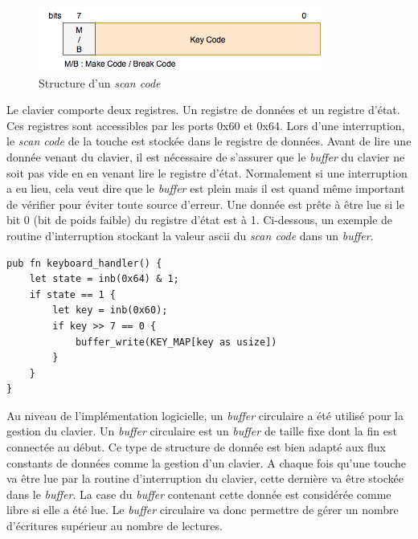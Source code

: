 \begin{figure}[!h]
  \centering
  \includegraphics[scale=0.8]{images/scancode.png}
  \caption{Structure d'un \textit{scan code}}
  \label{scancode}
\end{figure}

Le clavier comporte deux registres. Un registre de données et un registre d'état.
Ces registres sont accessibles par les ports 0x60 et 0x64. Lors d'une interruption,
le \textit{scan code} de la touche est stockée dans le registre de données. Avant
de lire une donnée venant du clavier, il est nécessaire de s'assurer que le
\textit{buffer} du clavier ne soit pas vide en en venant lire le registre d'état.
Normalement si une interruption a eu lieu, cela veut dire que le \textit{buffer}
est plein mais il est quand même important de vérifier pour éviter toute source
d'erreur. Une donnée est prête à être lue si le bit 0 (bit de poids faible) du
registre d'état est à 1. Ci-dessous, un exemple de routine d'interruption stockant
la valeur ascii du \textit{scan code} dans un \textit{buffer}.\\

\begin{verbatim}
pub fn keyboard_handler() {
    let state = inb(0x64) & 1;
    if state == 1 {
        let key = inb(0x60);
        if key >> 7 == 0 {
            buffer_write(KEY_MAP[key as usize])
        }
    }
}
\end{verbatim}

Au niveau de l'implémentation logicielle, un \textit{buffer} circulaire a été
utilisé pour la gestion du clavier. Un \textit{buffer} circulaire est un \textit{buffer}
de taille fixe dont la fin est connectée au début. Ce type de structure de donnée
est bien adapté aux flux constants de données comme la gestion d'un clavier.
A chaque fois qu'une touche va être lue par la routine d'interruption du clavier,
cette dernière va être stockée dans le \textit{buffer}. La case du \textit{buffer}
contenant cette donnée est considérée comme libre si elle a été lue. Le \textit{buffer}
circulaire va donc permettre de gérer un nombre d'écritures supérieur au nombre
de lectures.